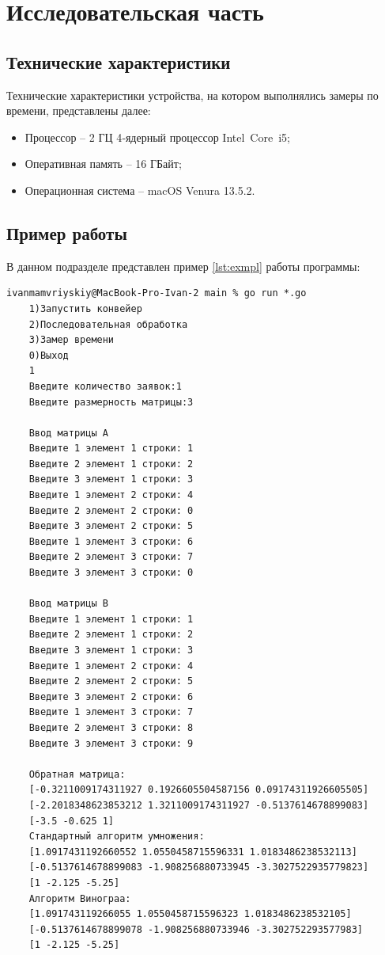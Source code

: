 \chapter{Исследовательская часть}

\section{Технические характеристики}

Технические характеристики устройства, на котором выполнялись замеры по времени, представлены далее:

\begin{itemize}
	\item Процессор -- 2 ГЦ 4‑ядерный процессор Intel Core i5;
	\item Оперативная память -- 16 ГБайт;
	\item Операционная система -- macOS Venura 13.5.2. 
\end{itemize}

\section{Пример работы}

В данном подразделе представлен пример \ref{lst:exmpl} работы программы: 

\begin{lstlisting}[label=lst:exmpl,caption=Пример работы программы]
    ivanmamvriyskiy@MacBook-Pro-Ivan-2 main % go run *.go
    1)Запустить конвейер
    2)Последовательная обработка
    3)Замер времени
    0)Выход
    1
    Введите количество заявок:1
    Введите размерность матрицы:3

    Ввод матрицы A
    Введите 1 элемент 1 строки: 1
    Введите 2 элемент 1 строки: 2
    Введите 3 элемент 1 строки: 3
    Введите 1 элемент 2 строки: 4
    Введите 2 элемент 2 строки: 0
    Введите 3 элемент 2 строки: 5
    Введите 1 элемент 3 строки: 6
    Введите 2 элемент 3 строки: 7
    Введите 3 элемент 3 строки: 0

    Ввод матрицы B
    Введите 1 элемент 1 строки: 1
    Введите 2 элемент 1 строки: 2
    Введите 3 элемент 1 строки: 3
    Введите 1 элемент 2 строки: 4
    Введите 2 элемент 2 строки: 5
    Введите 3 элемент 2 строки: 6
    Введите 1 элемент 3 строки: 7
    Введите 2 элемент 3 строки: 8
    Введите 3 элемент 3 строки: 9

    Обратная матрица:
    [-0.3211009174311927 0.1926605504587156 0.09174311926605505]
    [-2.2018348623853212 1.3211009174311927 -0.5137614678899083]
    [-3.5 -0.625 1]
    Стандартный алгоритм умножения:
    [1.0917431192660552 1.0550458715596331 1.0183486238532113]
    [-0.5137614678899083 -1.908256880733945 -3.3027522935779823]
    [1 -2.125 -5.25]
    Алгоритм Винограа:
    [1.091743119266055 1.0550458715596323 1.0183486238532105]
    [-0.5137614678899078 -1.908256880733946 -3.302752293577983]
    [1 -2.125 -5.25]
\end{lstlisting}

